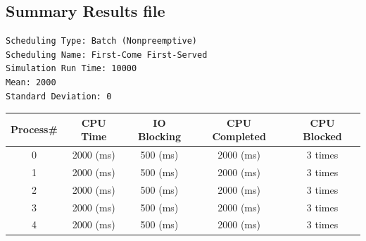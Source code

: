 \documentclass{article}
\begin{document}
\subsection{Summary Results file}
\begin{lstlisting}
Scheduling Type: Batch (Nonpreemptive)
Scheduling Name: First-Come First-Served
Simulation Run Time: 10000
Mean: 2000
Standard Deviation: 0
\end{lstlisting}
\begin{center}                        
\begin{tabular}{| c | c | c | c | c |}                                      
\hline                                                                      
Process\# &     CPU Time &      IO Blocking & CPU Completed & CPU Blocked \\
\hline
0&		2000 (ms)&	500 (ms)&	2000 (ms)&	3 times \\
\hline
1&		2000 (ms)&	500 (ms)&	2000 (ms)&	3 times \\
\hline
2&		2000 (ms)&	500 (ms)&	2000 (ms)&	3 times \\
\hline
3&		2000 (ms)&	500 (ms)&	2000 (ms)&	3 times \\
\hline
4&		2000 (ms)&	500 (ms)&	2000 (ms)&	3 times \\
\hline
\end{tabular}
\end{center}
           
\end{document}
